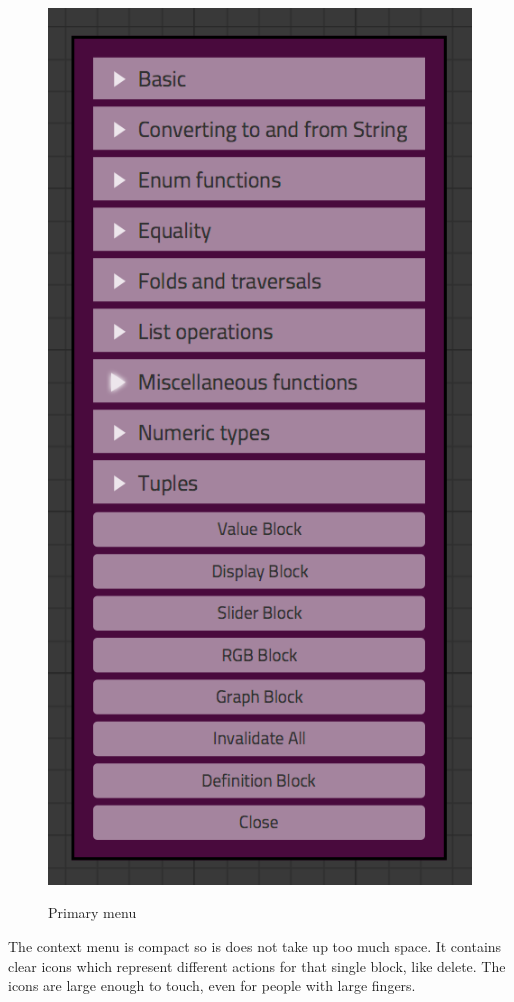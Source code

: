 \begin{figure}[p]
	\centering
	\includegraphics[scale=0.5]{Images/menu}
	\label{fig:ui-menu}
	\caption{Primary menu}
\end{figure}

The context menu is compact so is does not take up too much space. 
It contains clear icons which represent different actions for that single block, like delete.
The icons are large enough to touch, even for people with large fingers.

